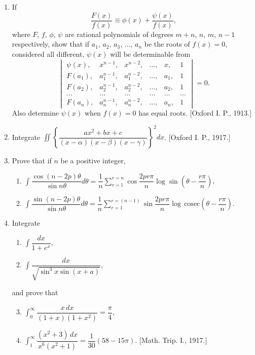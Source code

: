 \documentclass[11pt, a4paper]{article}
\newcommand{\source}[1]{\hfill\textnormal{[#1]}}
\begin{document}
\begin{enumerate}[leftmargin=2em]
\item If
\[
\dfrac{F(x)}{f(x)}\equiv \phi(x)+\dfrac{\psi(x)}{f(x)},
\]
where $F$, $f$, $\phi$, $\psi$ are rational polynomials of degrees $m+n$, $n$, $m$, $n-1$ respectively, show that if $a_1$, $a_2$, $a_3$, $\dots$, $a_n$ be the roots of $f(x)=0$, considered all different, $\psi(x)$ will be determinable from
\[
\begin{vmatrix}
\psi(x), & x^{n-1}, & x^{n-2}, & \dots, & x, & 1 \\
F(a_1), & a_1^{n-1}, & a_1^{n-2}, & \dots, & a_1, & 1 \\
F(a_2), & a_2^{n-1}, & a_2^{n-2}, & \dots, & a_2, & 1 \\
\dots & \dots & \dots & \dots & \dots & \dots \\
F(a_n), & a_n^{n-1}, & a_n^{n-2}, & \dots, & a_n, & 1
\end{vmatrix} = 0.
\]
Also determine $\psi(x)$ when $f(x)=0$ has equal roots. \source{Oxford I. P., 1913.}

\item Integrate $\displaystyle\iint \left\{\dfrac{ax^2+bx+c}{(x-\alpha)(x-\beta)(x-\gamma)}\right\}^2 dx$. \source{Oxford I. P., 1917.}

\item Prove that if $n$ be a positive integer,
\begin{enumerate}[label=(\roman*)]
\item $\displaystyle\int \dfrac{\cos(n-2p)\theta}{\sin n\theta}d\theta = \dfrac1n\sum_{r=1}^{r=n}\cos\dfrac{2pr\pi}{n}\log\sin\left(\theta-\dfrac{r\pi}{n}\right)$,
\item $\displaystyle\int \dfrac{\sin(n-2p)\theta}{\sin n\theta}d\theta = \dfrac1n\sum_{r=1}^{r=(n-1)}\sin\dfrac{2pr\pi}{n}\log\,\text{cosec}\left(\theta-\dfrac{r\pi}{n}\right)$.
\end{enumerate}

\item Integrate
\begin{enumerate}[label=(\roman*)]
\item $\displaystyle\int \dfrac{dx}{1+e^x}$,
\item $\displaystyle\int \dfrac{dx}{\sqrt{\sin^3x\sin(x+a)}}$,
\end{enumerate}
and prove that
\begin{enumerate}[label=(\roman*)]
\setcounter{enumii}{2}
\item $\displaystyle\int_0^\infty \dfrac{x\,dx}{(1+x)(1+x^2)}=\dfrac{\pi}{4}$,
\item $\displaystyle\int_1^\infty \dfrac{(x^2+3)\,dx}{x^6(x^2+1)}=\dfrac{1}{30}(58-15\pi)$. \source{Math. Trip. I., 1917.}
\end{enumerate}


\end{enumerate}
\end{document}
